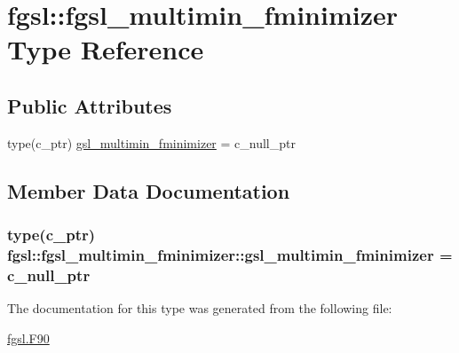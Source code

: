 \hypertarget{structfgsl_1_1fgsl__multimin__fminimizer}{}\section{fgsl\+:\+:fgsl\+\_\+multimin\+\_\+fminimizer Type Reference}
\label{structfgsl_1_1fgsl__multimin__fminimizer}
\subsection*{Public Attributes}
\begin{DoxyCompactItemize}
\item 
type(c\+\_\+ptr) \hyperlink{structfgsl_1_1fgsl__multimin__fminimizer_a6ebb36f6ff0b14b6fe92d65a330cdbe1}{gsl\+\_\+multimin\+\_\+fminimizer} = c\+\_\+null\+\_\+ptr
\end{DoxyCompactItemize}


\subsection{Member Data Documentation}
\hypertarget{structfgsl_1_1fgsl__multimin__fminimizer_a6ebb36f6ff0b14b6fe92d65a330cdbe1}{}
\subsubsection[{gsl\+\_\+multimin\+\_\+fminimizer}]{\setlength{\rightskip}{0pt plus 5cm}type(c\+\_\+ptr) fgsl\+::fgsl\+\_\+multimin\+\_\+fminimizer\+::gsl\+\_\+multimin\+\_\+fminimizer = c\+\_\+null\+\_\+ptr}\label{structfgsl_1_1fgsl__multimin__fminimizer_a6ebb36f6ff0b14b6fe92d65a330cdbe1}


The documentation for this type was generated from the following file\+:\begin{DoxyCompactItemize}
\item 
\hyperlink{fgsl_8F90}{fgsl.\+F90}\end{DoxyCompactItemize}
